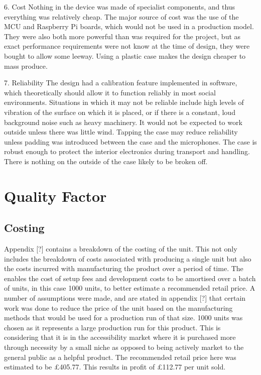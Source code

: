 \documentclass[a4paper]{article}
\begin{document}
6. Cost Nothing in the device was made of specialist components, and thus
everything was relatively cheap. The major source of cost was the use of the MCU
and Raspberry Pi boards, which would not be used in a production model. They
were also both more powerful than was required for the project, but as exact
performance requirements were not know at the time of design, they were bought
to allow some leeway. Using a plastic case makes the design cheaper to mass
produce.

7. Reliability The design had a calibration feature implemented in software,
which theoretically should allow it to function reliably in most social
environments. Situations in which it may not be reliable include high levels of
vibration of the surface on which it is placed, or if there is a constant, loud
background noise such as heavy machinery. It would not be expected to work
outside unless there was little wind. Tapping the case may reduce reliability
unless padding was introduced between the case and the microphones.  The case is
robust enough to protect the interior electronics during transport and handling.
There is nothing on the outside of the case likely to be broken off.


\section{Quality Factor}

\subsection{Costing}
Appendix [?] contains a breakdown of the costing of the unit. This not only
includes the breakdown of costs associated with producing a single unit but also
the costs incurred with manufacturing the product over a period of time. The
enables the cost of setup fees and development costs to be amortised over a
batch of units, in this case 1000 units, to better estimate a recommended retail
price. A number of assumptions were made, and are stated in appendix [?] that
certain work was done to reduce the price of the unit based on the manufacturing
methods that would be used for a production run of that size.  1000 units was
chosen as it represents a large production run for this product. This is
considering that it is in the accessibility market where it is purchased more
through necessity by a small niche as opposed to being actively market to the
general public as a helpful product.  The recommended retail price here was
estimated to be £405.77. This results in profit of £112.77 per unit sold.
\end{document}
